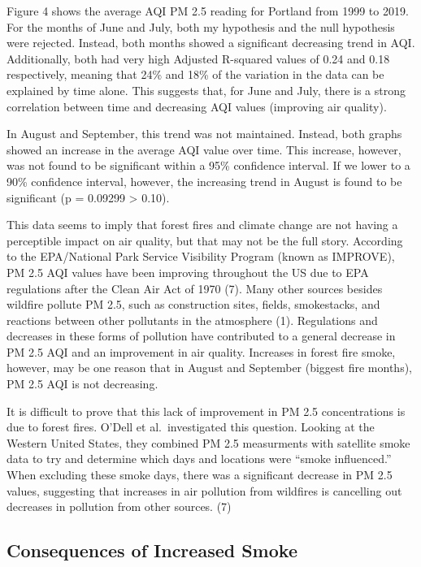 \documentclass[]{article}
\begin{document}
Figure 4 shows the average AQI PM 2.5 reading for Portland from 1999 to
2019. For the months of June and July, both my hypothesis and the null
hypothesis were rejected. Instead, both months showed a significant
decreasing trend in AQI. Additionally, both had very high Adjusted
R-squared values of 0.24 and 0.18 respectively, meaning that 24\% and
18\% of the variation in the data can be explained by time alone. This
suggests that, for June and July, there is a strong correlation between
time and decreasing AQI values (improving air quality).

In August and September, this trend was not maintained. Instead, both
graphs showed an increase in the average AQI value over time. This
increase, however, was not found to be significant within a 95\%
confidence interval. If we lower to a 90\% confidence interval, however,
the increasing trend in August is found to be significant (p = 0.09299
\textgreater{} 0.10).

This data seems to imply that forest fires and climate change are not
having a perceptible impact on air quality, but that may not be the full
story. According to the EPA/National Park Service Visibility Program
(known as IMPROVE), PM 2.5 AQI values have been improving throughout the
US due to EPA regulations after the Clean Air Act of 1970 (7). Many
other sources besides wildfire pollute PM 2.5, such as construction
sites, fields, smokestacks, and reactions between other pollutants in
the atmosphere (1). Regulations and decreases in these forms of
pollution have contributed to a general decrease in PM 2.5 AQI and an
improvement in air quality. Increases in forest fire smoke, however, may
be one reason that in August and September (biggest fire months), PM 2.5
AQI is not decreasing.

It is difficult to prove that this lack of improvement in PM 2.5
concentrations is due to forest fires. O'Dell et al.~investigated this
question. Looking at the Western United States, they combined PM 2.5
measurments with satellite smoke data to try and determine which days
and locations were ``smoke influenced.'' When excluding these smoke
days, there was a significant decrease in PM 2.5 values, suggesting that
increases in air pollution from wildfires is cancelling out decreases in
pollution from other sources. (7)

\hypertarget{consequences-of-increased-smoke}{%
\subsection{Consequences of Increased
Smoke}\label{consequences-of-increased-smoke}}
\end{document}
